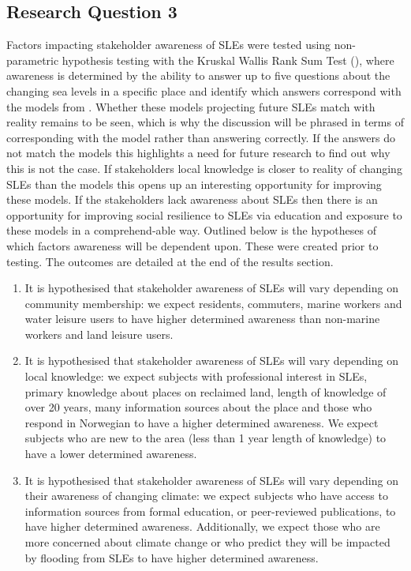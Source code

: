 \subsection{Research Question 3}
Factors  impacting stakeholder awareness of SLEs were tested using non-parametric hypothesis testing with the Kruskal Wallis Rank Sum Test (\cite{hollander_nonparametric_2014}), where awareness is determined by the ability to answer up to five questions about the changing sea levels in a specific place and identify which answers correspond with the models from \cite{kartverket_se_2021}. Whether these models projecting future SLEs match with reality remains to be seen, which is why the discussion will be phrased in terms of corresponding with the model rather than answering correctly. If the answers do not match the models this highlights a need for future research to find out why this is not the case. If stakeholders local knowledge is closer to reality of changing SLEs than the models this opens up an interesting opportunity for improving these models. If the stakeholders lack awareness about SLEs then there is an opportunity for improving social resilience to SLEs via education and exposure to these models in a comprehend-able way. Outlined below is the hypotheses of which factors awareness will be dependent upon. These were created prior to testing. The outcomes are detailed at the end of the results section. 

\begin{enumerate}
    \item It is hypothesised that stakeholder awareness of SLEs will vary depending on community membership: we expect residents, commuters, marine workers and water leisure users to have higher determined awareness than non-marine workers and land leisure users.
  
    \item It is hypothesised that stakeholder awareness of SLEs will vary depending on local knowledge: we expect subjects with professional interest in SLEs,  primary knowledge about places on reclaimed land, length of knowledge of over 20 years, many information sources about the place and those who respond in Norwegian to have a higher determined awareness. We expect subjects who are new to the area (less than 1 year length of knowledge) to have a lower determined awareness.

    \item It is hypothesised that stakeholder awareness of SLEs will vary depending on their awareness of changing climate: we expect subjects who have access to information sources from formal education, or peer-reviewed publications, to have higher determined awareness. Additionally, we expect those who are more concerned about climate change or who predict they will be impacted by flooding from SLEs to have higher determined awareness. 
\end{enumerate}

